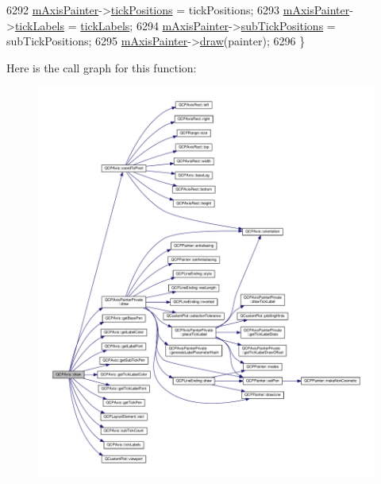 \begin{DoxyCode}
6292   \hyperlink{class_q_c_p_axis_aeeae00935bd2dab82d64f32544a90913}{mAxisPainter}->\hyperlink{class_q_c_p_axis_painter_private_ae55e3dc2cf2af8d8a6e7235ccab54786}{tickPositions} = tickPositions;
6293   \hyperlink{class_q_c_p_axis_aeeae00935bd2dab82d64f32544a90913}{mAxisPainter}->\hyperlink{class_q_c_p_axis_painter_private_ad0a4998ca358ba751e84fca45a025abd}{tickLabels} = \hyperlink{class_q_c_p_axis_a9a78fcccd98a73d37b3d991df7b6ef1d}{tickLabels};
6294   \hyperlink{class_q_c_p_axis_aeeae00935bd2dab82d64f32544a90913}{mAxisPainter}->\hyperlink{class_q_c_p_axis_painter_private_afcde7484bbcc1004b8f59ab984ada6f9}{subTickPositions} = subTickPositions;
6295   \hyperlink{class_q_c_p_axis_aeeae00935bd2dab82d64f32544a90913}{mAxisPainter}->\hyperlink{class_q_c_p_axis_painter_private_a0207a99bdf9c4f70af20928898ddc2fc}{draw}(painter);
6296 \}
\end{DoxyCode}


Here is the call graph for this function\+:\nopagebreak
\begin{figure}[H]
\begin{center}
\leavevmode
\includegraphics[width=350pt]{class_q_c_p_axis_a258b1e783eda5cd14ec5552c696a424e_cgraph}
\end{center}
\end{figure}


